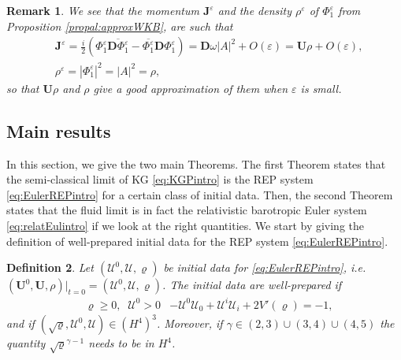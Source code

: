 \documentclass[a4paper, 15pt]{article}
\numberwithin{equation}{section}
\newtheorem{defi}{Definition}[section]
\newtheorem{rem}[defi]{Remark}
\begin{document}
\begin{rem}
\label{rem:jetrhoWKB}
   We see that the momentum $\textbf{J}^\varepsilon$ and the density $\rho^\varepsilon$ of $\Phi_1^\varepsilon$ from Proposition \ref{propal:approxWKB}, are such that
    \begin{align}
        &\textbf{J}^\varepsilon=\frac{i}{2}(\Phi_1^\varepsilon\overline{\textbf{D}\Phi_1^\varepsilon}-\overline{\Phi_1^\varepsilon}\textbf{D}\Phi_1^\varepsilon)=\textbf{D} \omega|A|^2+O(\varepsilon)=\textbf{U}\rho+O(\varepsilon),\\
        &\rho^\varepsilon=|\Phi_1^\varepsilon|^2=|A|^2=\rho,
    \end{align}
    so that $\textbf{U}\rho$ and $\rho$ give a good approximation of them when $\varepsilon$ is small.
\end{rem}

\subsection{Main results}
\label{subsection:mainresults}
In this section, we give the two main Theorems. The first Theorem states that the semi-classical limit of KG \eqref{eq:KGPintro} is the REP system \eqref{eq:EulerREPintro} for a certain class of initial data. Then, the second Theorem states that the fluid limit is in fact the relativistic barotropic Euler system \eqref{eq:relatEulintro} if we look at the right quantities. We start by giving the definition of well-prepared initial data for the REP system \eqref{eq:EulerREPintro}.\\
\begin{defi}
    \label{defi:wellprepREP}
    Let $(\mathscr{U}^0,\mathscr{U},\varrho)$ be initial data for \eqref{eq:EulerREPintro}, i.e. $(\textbf{U}^0,\textbf{U},\rho)|_{t=0}=(\mathscr{U}^0,\mathscr{U},\varrho)$. The initial data are well-prepared if 
    \begin{align}
        &\varrho\geq0,\;\; \mathscr{U}^0>0 &-\mathscr{U}^0\mathscr{U}_0+\mathscr{U}^i\mathscr{U}_i+2V'(\varrho)=-1, 
    \end{align}
    and if $(\sqrt{\varrho},\mathscr{U}^0,\mathscr{U})\in (H^4)^3$. Moreover, if $\gamma\in(2,3)\cup(3,4)\cup(4,5)$ the quantity $\sqrt{\varrho}^{\gamma-1}$ needs to be in $H^4$.\\
\end{defi}
\end{document}
